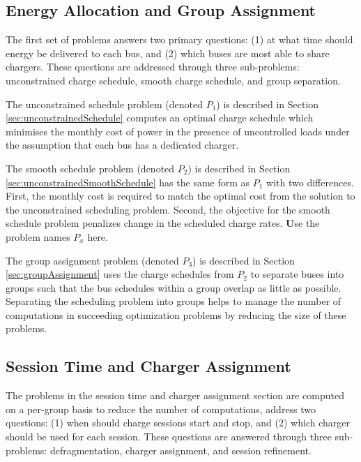 \subsection{Energy Allocation and Group Assignment} 
\par The first set of problems answers two primary questions: (1) at what time should energy be delivered to each bus, and (2) which buses are most able to share chargers.  These questions are addressed through three sub-problems: unconstrained charge schedule, smooth charge schedule, and group separation.  
\par The unconstrained schedule problem (denoted $P_1$) is described in Section \ref{sec:unconstrainedSchedule} computes an optimal charge schedule which minimises the monthly cost of power in the presence of uncontrolled loads under the assumption that each bus has a dedicated charger.  
\par The smooth schedule problem (denoted $P_2$) is described in Section \ref{sec:unconstrainedSmoothSchedule} has the same form as $P_1$ with two differences.  First, the monthly cost is required to match the optimal cost from the solution to the unconstrained scheduling problem. Second, the objective for the smooth schedule problem penalizes change in the scheduled charge rates. {\textbf Use the problem names $P_x$ here.}
\par The group assignment problem (denoted $P_3$) is described in Section \ref{sec:groupAssignment} uses the charge schedules from $P_2$ to separate buses into groups such that the bus schedules within a group overlap as little as possible.  Separating the scheduling problem into groups helps to manage the number of computations in succeeding optimization problems by reducing the size of these problems.

\subsection{Session Time and Charger Assignment} 
The problems in the session time and charger assignment section are computed on a per-group basis to reduce the number of computations, address two questions: (1) when should charge sessions start and stop, and (2) which charger should be used for each session.  These questions are answered through three sub-problems: defragmentation, charger assignment, and session refinement.

